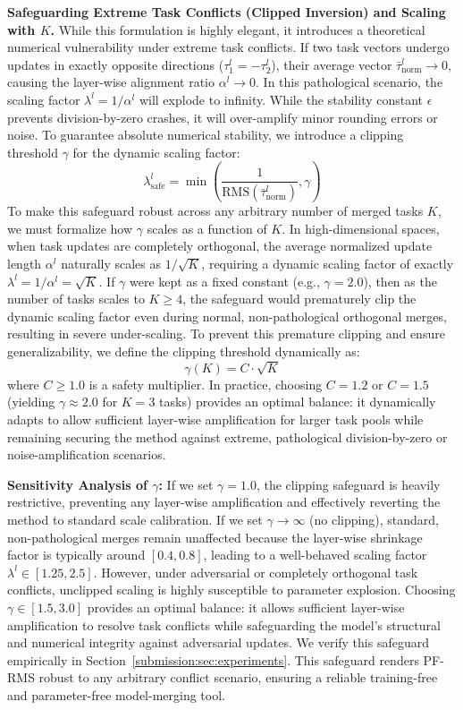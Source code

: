 \textbf{Safeguarding Extreme Task Conflicts (Clipped Inversion) and Scaling with $K$.}
While this formulation is highly elegant, it introduces a theoretical numerical vulnerability under extreme task conflicts. If two task vectors undergo updates in exactly opposite directions ($\tau_1^l = -\tau_2^l$), their average vector $\bar{\tau}_{\text{norm}}^l \to 0$, causing the layer-wise alignment ratio $\alpha^l \to 0$. In this pathological scenario, the scaling factor $\lambda^l = 1/\alpha^l$ will explode to infinity. While the stability constant $\epsilon$ prevents division-by-zero crashes, it will over-amplify minor rounding errors or noise. To guarantee absolute numerical stability, we introduce a clipping threshold $\gamma$ for the dynamic scaling factor:
\begin{equation}
\lambda_{\text{safe}}^l = \min\left( \frac{1}{\text{RMS}(\bar{\tau}_{\text{norm}}^l)}, \gamma \right)
\end{equation}
To make this safeguard robust across any arbitrary number of merged tasks $K$, we must formalize how $\gamma$ scales as a function of $K$. In high-dimensional spaces, when task updates are completely orthogonal, the average normalized update length $\alpha^l$ naturally scales as $1/\sqrt{K}$, requiring a dynamic scaling factor of exactly $\lambda^l = 1/\alpha^l = \sqrt{K}$. If $\gamma$ were kept as a fixed constant (e.g., $\gamma = 2.0$), then as the number of tasks scales to $K \ge 4$, the safeguard would prematurely clip the dynamic scaling factor even during normal, non-pathological orthogonal merges, resulting in severe under-scaling. To prevent this premature clipping and ensure generalizability, we define the clipping threshold dynamically as:
\begin{equation}
\gamma(K) = C \cdot \sqrt{K}
\end{equation}
where $C \ge 1.0$ is a safety multiplier. In practice, choosing $C = 1.2$ or $C = 1.5$ (yielding $\gamma \approx 2.0$ for $K=3$ tasks) provides an optimal balance: it dynamically adapts to allow sufficient layer-wise amplification for larger task pools while remaining securing the method against extreme, pathological division-by-zero or noise-amplification scenarios. 

\textbf{Sensitivity Analysis of $\gamma$:} If we set $\gamma = 1.0$, the clipping safeguard is heavily restrictive, preventing any layer-wise amplification and effectively reverting the method to standard scale calibration. If we set $\gamma \to \infty$ (no clipping), standard, non-pathological merges remain unaffected because the layer-wise shrinkage factor is typically around $[0.4, 0.8]$, leading to a well-behaved scaling factor $\lambda^l \in [1.25, 2.5]$. However, under adversarial or completely orthogonal task conflicts, unclipped scaling is highly susceptible to parameter explosion. Choosing $\gamma \in [1.5, 3.0]$ provides an optimal balance: it allows sufficient layer-wise amplification to resolve task conflicts while safeguarding the model's structural and numerical integrity against adversarial updates. We verify this safeguard empirically in Section~\ref{submission:sec:experiments}. This safeguard renders PF-RMS robust to any arbitrary conflict scenario, ensuring a reliable training-free and parameter-free model-merging tool.

